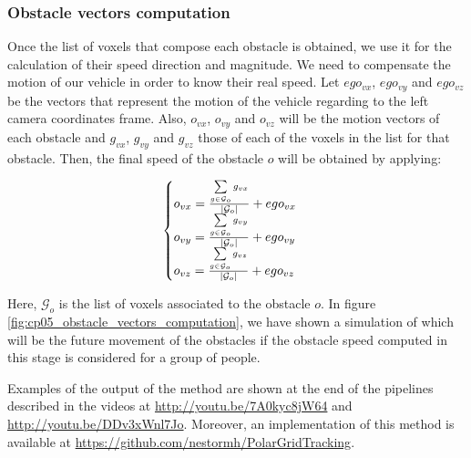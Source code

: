 \FloatBarrier

\subsubsection{Obstacle vectors computation}\label{ch:chapter05_01_05_01}

Once the list of voxels that compose each obstacle is obtained, we use it for the calculation of their speed direction and magnitude. We need to compensate the motion of our vehicle in order to know their real speed. Let $ego_{vx}$, $ego_{vy}$ and $ego_{vz}$ be the vectors that represent the motion of the vehicle regarding to the left camera coordinates frame. Also, $o_{vx}$, $o_{vy}$ and $o_{vz}$ will be the motion vectors of each obstacle and $g_{vx}$, $g_{vy}$ and $g_{vz}$ those of each of the voxels in the list for that obstacle. Then, the final speed of the obstacle $o$ will be obtained by applying:

\begin{equation}\label{eq:cp05_obstacle_vectors_computation}
\begin{cases}
o_{vx} = {{\sum\limits_{g \in \mathcal{G}_o} g_{vx}} \over {|\mathcal{G}_o|}} + ego_{vx}\\
o_{vy} = {{\sum\limits_{g \in \mathcal{G}_o} g_{vy}} \over {|\mathcal{G}_o|}} + ego_{vy}\\
o_{vz} = {{\sum\limits_{g \in \mathcal{G}_o} g_{vz}} \over {|\mathcal{G}_o|}} + ego_{vz}
\end{cases}
\end{equation}

Here, $\mathcal{G}_o$ is the list of voxels associated to the obstacle $o$. In figure \ref{fig:cp05_obstacle_vectors_computation}, we have shown a simulation of which will be the future movement of the obstacles if the obstacle speed computed in this stage is considered for a group of people.

Examples of the output of the method are shown at the end of the pipelines described in the videos at \url{http://youtu.be/7A0kyc8jW64} and \url{http://youtu.be/DDv3xWnl7Jo}. Moreover, an implementation of this method is available at \url{https://github.com/nestormh/PolarGridTracking}.


